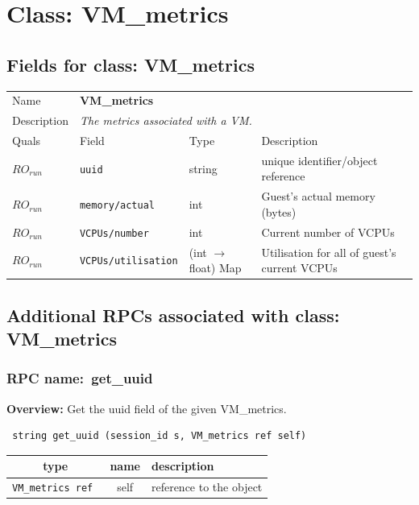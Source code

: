 \vspace{1cm}
\newpage
\section{Class: VM\_metrics}
\subsection{Fields for class: VM\_metrics}
\begin{longtable}{|lllp{}|}
\hline
\multicolumn{1}{|l}{Name} & \multicolumn{3}{l|}{\bf VM\_metrics} \\
\multicolumn{1}{|l}{Description} & \multicolumn{3}{l|}{\parbox{11cm}{\em
The metrics associated with a VM.}} \\
\hline
Quals & Field & Type & Description \\
\hline
$\mathit{RO}_\mathit{run}$ &  {\tt uuid} & string & unique identifier/object reference \\
$\mathit{RO}_\mathit{run}$ &  {\tt memory/actual} & int & Guest's actual memory (bytes) \\
$\mathit{RO}_\mathit{run}$ &  {\tt VCPUs/number} & int & Current number of VCPUs \\
$\mathit{RO}_\mathit{run}$ &  {\tt VCPUs/utilisation} & (int $\rightarrow$ float) Map & Utilisation for all of guest's current VCPUs \\
\hline
\end{longtable}
\subsection{Additional RPCs associated with class: VM\_metrics}
\subsubsection{RPC name:~get\_uuid}

{\bf Overview:} 
Get the uuid field of the given VM\_metrics.

\begin{verbatim} string get_uuid (session_id s, VM_metrics ref self)\end{verbatim}



 
\vspace{0.3cm}
\begin{tabular}{|c|c|p{7cm}|}
 \hline
{\bf type} & {\bf name} & {\bf description} \\ \hline
{\tt VM\_metrics ref } & self & reference to the object \\ \hline 

\end{tabular}

